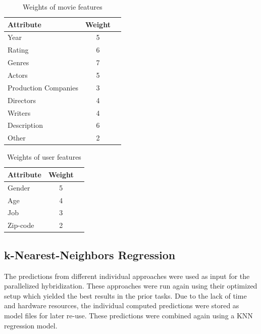 \documentclass{sigish}
\begin{document}
\begin{table}[]
\centering
\begin{tabular}{|l|c|c|}
\hline
\textbf{Attribute} & \textbf{Weight} \\ \hline
Year             & 5               \\ \hline
Rating             & 6               \\ \hline
Genres             & 7               \\ \hline
Actors             & 5               \\ \hline
Production Companies             & 3               \\ \hline
Directors             & 4               \\ \hline
Writers             & 4               \\ \hline
Description             & 6               \\ \hline
Other             & 2               \\ \hline
\end{tabular}
\caption{Weights of movie features}
\label{tab:movie_weights}
\end{table}

\begin{table}[]
	\centering
	\begin{tabular}{|l|c|c|}
		\hline
		\textbf{Attribute} & \textbf{Weight} \\ \hline
		Gender             & 5               \\ \hline
		Age             & 4               \\ \hline
		Job             & 3               \\ \hline
		Zip-code             & 2               \\ \hline
	\end{tabular}
	\caption{Weights of user features}
	\label{tab:user_weights}
\end{table}

\subsection{k-Nearest-Neighbors Regression}
The predictions from different individual approaches were used as input for the parallelized hybridization. These approaches were run again using their optimized setup which yielded the best results in the prior tasks. Due to the lack of time and hardware resources, the individual computed predictions were stored as model files for later re-use. These predictions were combined again using a KNN regression model.
\end{document}

